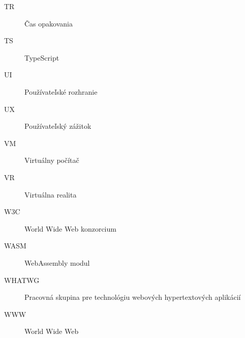 \begin{description}
	\item[TR] Čas opakovania
	\item[TS] TypeScript
	\item[UI] Používateľské rozhranie
	\item[UX] Používateľský zážitok
	\item[VM] Virtuálny počítač
	\item[VR] Virtuálna realita
	\item[W3C] World Wide Web konzorcium
	\item[WASM] WebAssembly modul
	\item[WHATWG] Pracovná skupina pre technológiu webových hypertextových aplikácií
	\item[WWW] World Wide Web
\end{description}